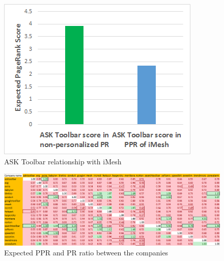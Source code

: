 \documentclass[11pt,oneside]{book}
\begin{document}

\iffalse
\begin{figure}[!htbp]
\centering
\includegraphics[scale=0.8]{figures/ask_clash_imesh.png}
\caption{ASK Toolbar relationship with iMesh}
\label{fig:ask_clash_imesh}
\end{figure}

\begin{figure}
    \includegraphics[scale=0.8]{figures/RatioMatrix.png}
    \caption{Expected PPR and PR ratio between the companies}
    \label{fig:RatioMatrix}
\end{figure}
\end{document}
